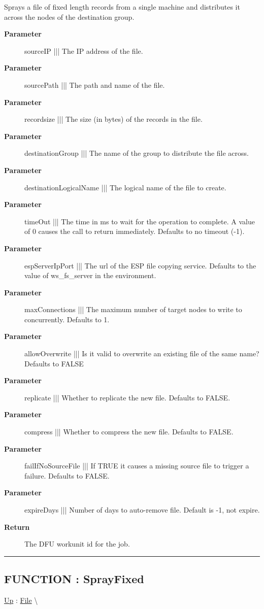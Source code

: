 \par
Sprays a file of fixed length records from a single machine and distributes it across the nodes of the destination group.

\par
\begin{description}
\item [\textbf{Parameter}] sourceIP ||| The IP address of the file.
\item [\textbf{Parameter}] sourcePath ||| The path and name of the file.
\item [\textbf{Parameter}] recordsize ||| The size (in bytes) of the records in the file.
\item [\textbf{Parameter}] destinationGroup ||| The name of the group to distribute the file across.
\item [\textbf{Parameter}] destinationLogicalName ||| The logical name of the file to create.
\item [\textbf{Parameter}] timeOut ||| The time in ms to wait for the operation to complete. A value of 0 causes the call to return immediately. Defaults to no timeout (-1).
\item [\textbf{Parameter}] espServerIpPort ||| The url of the ESP file copying service. Defaults to the value of ws\_fs\_server in the environment.
\item [\textbf{Parameter}] maxConnections ||| The maximum number of target nodes to write to concurrently. Defaults to 1.
\item [\textbf{Parameter}] allowOverwrite ||| Is it valid to overwrite an existing file of the same name? Defaults to FALSE
\item [\textbf{Parameter}] replicate ||| Whether to replicate the new file. Defaults to FALSE.
\item [\textbf{Parameter}] compress ||| Whether to compress the new file. Defaults to FALSE.
\item [\textbf{Parameter}] failIfNoSourceFile ||| If TRUE it causes a missing source file to trigger a failure. Defaults to FALSE.
\item [\textbf{Parameter}] expireDays ||| Number of days to auto-remove file. Default is -1, not expire.
\item [\textbf{Return}] The DFU workunit id for the job.
\end{description}

\rule{\linewidth}{0.5pt}
\subsection*{FUNCTION : SprayFixed}
\hypertarget{ecldoc:file.sprayfixed}{}
\hyperlink{ecldoc:File}{Up} :
\hspace{0pt} \hyperlink{ecldoc:File}{File} \textbackslash 

